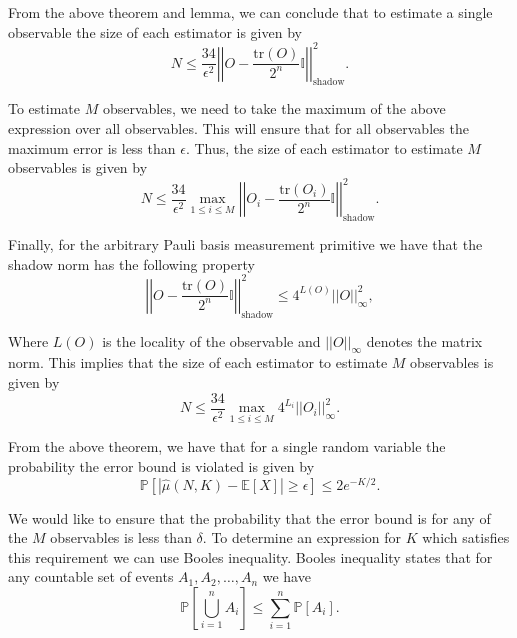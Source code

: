 \documentclass[12pt]{article}
\begin{document}
    From the above theorem and lemma, we can conclude that to estimate a single observable the size of each estimator is given by 
    \begin{equation}
        N \leq \frac{34}{\epsilon^2}\left|\left| O - \frac{\text{tr}(O)}{2^n} \mathbb{I} \right|\right|^2_\text{shadow}.
    \end{equation}

    To estimate $M$ observables, we need to take the maximum of the above expression over all observables. This will ensure that for all observables the maximum error is less than $\epsilon$. Thus, the size of each estimator to estimate $M$ observables is given by
    \begin{equation}
        N \leq \frac{34}{\epsilon^2} \max_{1\leq i \leq M} \left|\left| O_i - \frac{\text{tr}(O_i)}{2^n} \mathbb{I} \right|\right|^2_\text{shadow}.
    \end{equation}

    Finally, for the arbitrary Pauli basis measurement primitive we have that the shadow norm has the following property
    \begin{equation}
        \left|\left| O - \frac{\text{tr}(O)}{2^n} \mathbb{I} \right|\right|^2_\text{shadow} \leq 4^{L(O)} ||O||^2_\infty,
    \end{equation}

    Where $L(O)$ is the locality of the observable and $||O||_\infty$ denotes the matrix norm. This implies that the size of each estimator to estimate $M$ observables is given by
    \begin{equation}
        N \leq \frac{34}{\epsilon^2} \max_{1\leq i \leq M} 4^{L_i} ||O_i||^2_\infty.
    \end{equation}

    From the above theorem, we have that for a single random variable the probability the error bound is violated is given by
    \begin{equation}
        \mathbb{P}[|\hat{\mu}(N, K) - \mathbb{E}[X]| \geq \epsilon] \leq 2e^{-K/2}.
    \end{equation}

    We would like to ensure that the probability that the error bound is for any of the $M$ observables is less than $\delta$. To determine an expression for $K$ which satisfies this requirement we can use Booles inequality. Booles inequality states that for any countable set of events $A_1, A_2, \ldots, A_n$ we have
    \begin{equation}
        \mathbb{P}\left[\bigcup_{i=1}^n A_i\right] \leq \sum_{i=1}^n \mathbb{P}[A_i].
    \end{equation}
\end{document}
